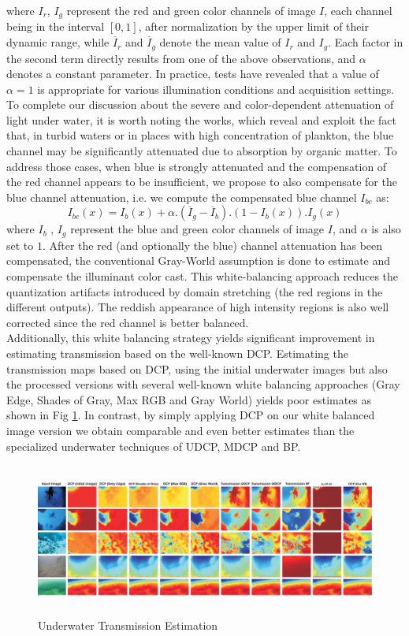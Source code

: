 \documentclass[hidelinks, 12pt]{report}
\begin{document}
where $I_r$, $I_g$ represent the red and green color channels of image $I$, each channel being in the interval $[0, 1]$, after normalization by the upper limit of their dynamic range, while $\overline{I}_r$ and $\overline{I}_g$ denote the mean value of $I_r$ and $I_g$. Each factor in the second term directly results from one of the above observations, and $\alpha$ denotes a constant parameter. In practice, tests have revealed that a value of $\alpha=1$ is appropriate for various illumination conditions and acquisition settings.\\
To complete our discussion about the severe and color-dependent attenuation of light under water, it is worth noting the works\cite{hl}, which reveal and exploit the fact that, in turbid waters or in places with high concentration of plankton, the blue channel may be significantly attenuated due to absorption by organic matter. To address those cases, when blue is strongly attenuated and the compensation of the red channel appears to be insufficient, we propose to also compensate for the blue channel attenuation, i.e. we compute the compensated blue channel $I_{bc}$ as:
\begin{equation}
I_{bc}(x)=I_b(x)+\alpha.(\overline{I}_g-\overline{I}_b).(1-I_b(x)).I_g(x)
\end{equation}
where $I_b$ , $I_g$ represent the blue and green color channels of image $I$, and $\alpha$ is also set to $1$. After the red (and optionally the blue) channel attenuation has been compensated, the conventional Gray-World assumption is done to estimate and compensate the illuminant color cast. This white-balancing approach reduces the quantization artifacts introduced by domain stretching (the red regions in the different outputs). The reddish appearance of high intensity regions is also well corrected since the red channel is better balanced.\\
Additionally, this white balancing strategy yields significant improvement in estimating transmission based on the well-known DCP. Estimating the transmission maps based on DCP, using the initial underwater images but also the processed versions with several well-known white balancing approaches (Gray Edge, Shades of Gray, Max RGB and Gray World) yields poor estimates as shown in Fig \ref{Transmission}. In contrast, by simply applying DCP on our white balanced
image version we obtain comparable and even better estimates than the specialized underwater techniques of UDCP, MDCP and BP\cite{vd}.
\begin{figure}[H]
\centering
\includegraphics[width=15cm,height=5cm]{Transmission.png}
\caption[Underwater Transmission Estimation]{Underwater Transmission Estimation}
\label{Transmission}
\end{figure}
\end{document}
